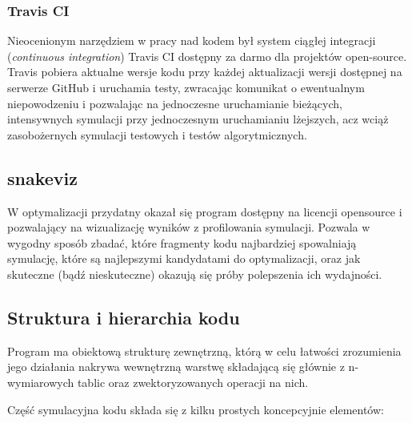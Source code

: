     \subsubsection{Travis CI}
    Nieocenionym narzędziem w pracy nad kodem był system ciągłej integracji (\emph{continuous integration})
    Travis CI 
    dostępny za darmo dla projektów open-source. Travis pobiera aktualne wersje kodu przy każdej aktualizacji
    wersji dostępnej na serwerze GitHub i uruchamia testy, zwracając komunikat o ewentualnym niepowodzeniu i
    pozwalając na jednoczesne uruchamianie bieżących, intensywnych symulacji przy jednoczesnym uruchamianiu
    lżejszych, acz wciąż zasobożernych 
    symulacji testowych i testów algorytmicznych.

    \subsection{snakeviz}
    W optymalizacji przydatny okazał się program  dostępny na licencji opensource i pozwalający na
    wizualizację wyników z profilowania symulacji. Pozwala w wygodny sposób zbadać, które fragmenty kodu najbardziej
    spowalniają symulację, które są najlepszymi kandydatami do optymalizacji, oraz jak skuteczne (bądź nieskuteczne)
    okazują się próby polepszenia ich wydajności.

    \subsection{Struktura i hierarchia kodu}

    Program ma obiektową strukturę zewnętrzną, którą w celu łatwości zrozumienia jego działania nakrywa wewnętrzną warstwę
    składającą się głównie z n-wymiarowych tablic  oraz zwektoryzowanych operacji na nich.

    Część symulacyjna kodu składa się z kilku prostych koncepcyjnie elementów:

